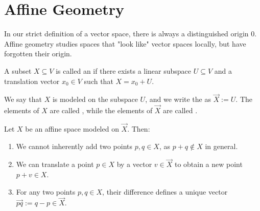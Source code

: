 \section{Affine Geometry}

In our strict definition of a vector space, there is always a distinguished origin $0$. Affine geometry studies spaces that "look like" vector spaces locally, but have forgotten their origin.

\begin{definition}
  A subset $X \subseteq V$ is called an  if there exists a linear subspace $U \subseteq V$ and a translation vector $x_0 \in V$ such that $X = x_0 + U$.

  We say that $X$ is modeled on the subspace $U$, and we write the  as $\vec{X} := U$. The elements of $X$ are called , while the elements of $\vec{X}$ are called .
\end{definition}

\begin{proposition}
  Let $X$ be an affine space modeled on $\vec{X}$. Then:
  \begin{enumerate}
    \item We cannot inherently add two points $p, q \in X$, as $p+q \notin X$ in general.
    \item We can translate a point $p \in X$ by a vector $v \in \vec{X}$ to obtain a new point $p+v \in X$.
    \item For any two points $p, q \in X$, their difference defines a unique vector $\vec{pq} := q - p \in \vec{X}$.
  \end{enumerate}
\end{proposition}

\begin{center}
\end{center}

